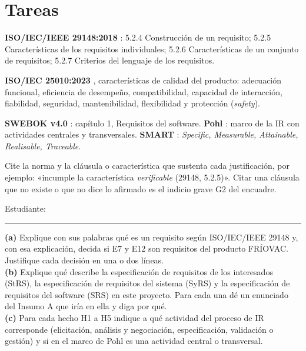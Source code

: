 \documentclass[11pt]{article}
\newcommand{\seccion}[1]{\section{\textcolor{utegreendk}{#1}}}
\begin{document}
\seccion{Tareas}

\begin{cajaclave}[title={Referencias que puede citar (sin consultar los documentos)}]
	\textbf{ISO/IEC/IEEE 29148:2018} \citep{iso29148_2018}: 5.2.4 Construcción de un requisito; 5.2.5 Características de los requisitos individuales; 5.2.6 Características de un conjunto de requisitos; 5.2.7 Criterios del lenguaje de los requisitos.\par
	\textbf{ISO/IEC 25010:2023} \citep{iso25010_2023}, características de calidad del producto: adecuación funcional, eficiencia de desempeño, compatibilidad, capacidad de interacción, fiabilidad, seguridad, mantenibilidad, flexibilidad y protección (\emph{safety}).\par
	\textbf{SWEBOK v4.0} \citep{swebok_v4_2024}: capítulo 1, Requisitos del software. \textbf{Pohl} \citep{pohl_2025}: marco de la IR con actividades centrales y transversales. \textbf{SMART} \citep{mannion_smart_1995}: \emph{Specific, Measurable, Attainable, Realisable, Traceable}.\par
	Cite la norma y la cláusula o característica que sustenta cada justificación, por ejemplo: «incumple la característica \emph{verificable} (29148, 5.2.5)». Citar una cláusula que no existe o que no dice lo afirmado es el indicio grave G2 del encuadre.
\end{cajaclave}

\begin{cajarespuesta}[title={Respuesta del estudiante: inicio de la hoja 1}]
	Estudiante: \rule{0.6\linewidth}{0.4pt}
\end{cajarespuesta}


\begin{cajatarea}[title={T1. Conceptos aplicados al caso \hfill D1 · 10\,\%}]
	\textbf{(a)} Explique con sus palabras qué es un requisito según ISO/IEC/IEEE 29148 y, con esa explicación, decida si E7 y E12 son requisitos del producto FRÍOVAC. Justifique cada decisión en una o dos líneas.\\[4pt]
	\textbf{(b)} Explique qué describe la especificación de requisitos de los interesados (StRS), la especificación de requisitos del sistema (SyRS) y la especificación de requisitos del software (SRS) en este proyecto. Para cada una dé un enunciado del Insumo A que iría en ella y diga por qué.\\[4pt]
	\textbf{(c)} Para cada hecho H1 a H5 indique a qué actividad del proceso de IR corresponde (elicitación, análisis y negociación, especificación, validación o gestión) y si en el marco de Pohl es una actividad central o transversal.
\end{cajatarea}
\end{document}
